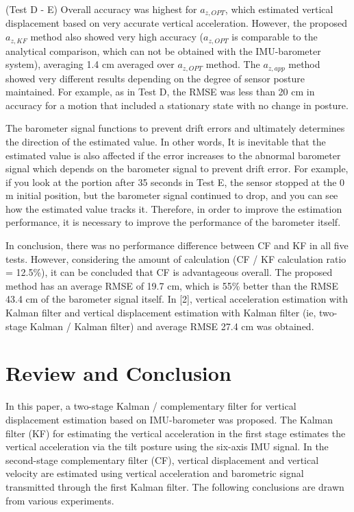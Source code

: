 \documentclass[10pt,journal,compsoc]{IEEEtran}
\begin{document}
(Test D - E) Overall accuracy was highest for $a_{z,OPT}$, which estimated
vertical displacement based on very accurate vertical acceleration. However,
the proposed $a_{z,KF}$ method also showed very high accuracy ($a_{z,OPT}$ is
comparable to the analytical comparison, which can not be obtained with the
IMU-barometer system), averaging 1.4 cm averaged over $a_{z,OPT}$ method.
The $a_{z,app}$ method showed very different results depending on the degree of
sensor posture maintained.  For example, as in Test D, the RMSE was less than 20
cm in accuracy for a motion that included a stationary state with no change in
posture.

The barometer signal functions to prevent drift errors and ultimately
determines the direction of the estimated value. In other words, It is
inevitable that the estimated value is also affected if the error increases to
the abnormal barometer signal which depends on the barometer signal to prevent
drift error.  For example, if you look at the portion after 35 seconds in Test
E, the sensor stopped at the 0 m initial position, but the barometer signal
continued to drop, and you can see how the estimated value tracks it. Therefore, in
order to improve the estimation performance, it is necessary to improve the
performance of the barometer itself.

In conclusion, there was no performance difference between CF and KF in all
five tests.  However, considering the amount of calculation (CF / KF
calculation ratio = 12.5\%), it can be concluded that CF is advantageous
overall. The proposed method has an average RMSE of 19.7 cm, which is 55\%
better than the RMSE 43.4 cm of the barometer signal itself.  In [2], vertical
acceleration estimation with Kalman filter and vertical displacement estimation
with Kalman filter (ie, two-stage Kalman / Kalman filter) and average RMSE 27.4
cm was obtained.

\section{Review and Conclusion}

In this paper, a two-stage Kalman / complementary filter for vertical
displacement estimation based on IMU-barometer was proposed. The Kalman filter
(KF) for estimating the vertical acceleration in the first stage estimates the
vertical acceleration via the tilt posture using the six-axis IMU signal. In the
second-stage complementary filter (CF), vertical displacement and vertical
velocity are estimated using vertical acceleration and barometric signal
transmitted through the first Kalman filter. The following conclusions are
drawn from various experiments.
\end{document}
